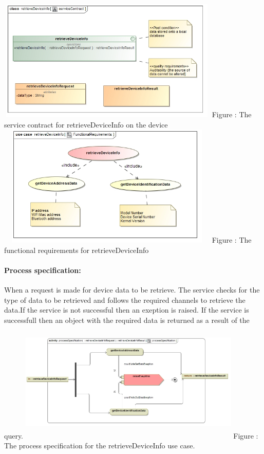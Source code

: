 \documentclass[hidelinks, 12pt, oneside]{article}
\begin{document}
		\includegraphics[width=400px,height=220px]{img/serviceContractRetrieveDeviceInfo.jpg}
		Figure : The service contract for retrieveDeviceInfo on the device
		\newline
		\includegraphics[width=400px,height=220px]{img/functionalRequirementsRetrieveDeviceInfo.jpg}
		Figure : The functional requirements for retrieveDeviceInfo
		\newline
		
		\paragraph{Process specification:}
		When a request is made for device data to be retrieve. The service checks for the type of data to 			be retrieved and follows the required channels to retrieve the data.If the service is not 					successful then an exeption is raised. If the service is successfull then an object with the 				required data is returned as a result of the query.\newline\newline
		\includegraphics[width=400px,height=220px]{img/processSpecificationRetrieveDeviceInfo.jpg}
		Figure : The process specification for the retrieveDeviceInfo use case.
		
\end{document}
